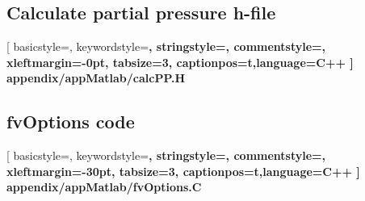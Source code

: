 \subsection{Calculate partial pressure h-file}
\label{app:ch:Matlab:sec:OF:subsec:calcP}

[	%
	basicstyle=\scriptsize\ttfamily,
	keywordstyle=\bfseries\ttfamily\color{orange},
	stringstyle=\color{darkgreen}\ttfamily,
	commentstyle=\color{gray}\ttfamily,
	xleftmargin=-0pt,
	tabsize=3,
	captionpos=t,language=C++
]
{appendix/appMatlab/calcPP.H}
\subsection{fvOptions code}
\label{app:ch:Matlab:sec:OF:subsec:fvOptions}
\begin{landscape}

[	%
	basicstyle=\scriptsize\ttfamily,
	keywordstyle=\bfseries\ttfamily\color{orange},
	stringstyle=\color{darkgreen}\ttfamily,
	commentstyle=\color{gray}\ttfamily,
	xleftmargin=-30pt,
	tabsize=3,
	captionpos=t,language=C++
]
{appendix/appMatlab/fvOptions.C}
\end{landscape}